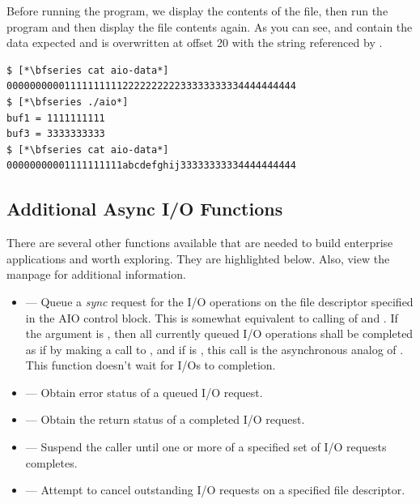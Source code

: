 \noindent
Before running the program, we display the contents of the  file, then run the program and then display the file contents again. As you can see,  and  contain the data expected and  is overwritten at offset 20 with the string  referenced by .

\begin{lstlisting}
$ [*\bfseries cat aio-data*]
00000000001111111111222222222233333333334444444444
$ [*\bfseries ./aio*]
buf1 = 1111111111
buf3 = 3333333333
$ [*\bfseries cat aio-data*]
00000000001111111111abcdefghij33333333334444444444
\end{lstlisting}


\subsection{Additional Async I/O Functions}

There are several other functions available that are needed to build enterprise applications and worth exploring. They are highlighted below. Also, view the  manpage for additional information.

\begin{itemize}
       \item {} --- Queue a \textit{sync} request for the I/O operations on the file descriptor specified
       		in the AIO control block. This is somewhat equivalent to calling of  and . 
		If the  argument is , then all currently queued I/O operations shall 
		be completed as if by making a call to , and if  is , this call is the 
		asynchronous analog of . This function doesn't wait for I/Os to completion.

       \item {} --- Obtain  error status of a queued I/O request.

       \item {} --- Obtain the return status of a completed I/O request.

       \item {} --- Suspend the caller until one or more of a specified set of I/O requests completes.

       \item {} --- Attempt to cancel outstanding I/O requests on a specified file descriptor.
\end{itemize}

